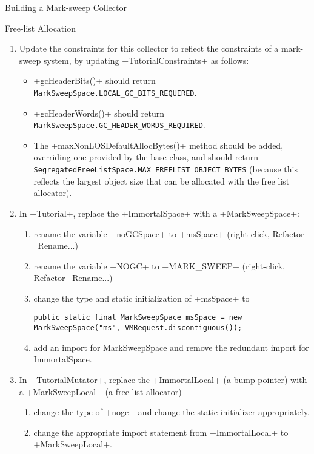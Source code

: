\begin{section}{Building a Mark-sweep Collector}
\begin{subsection}{Free-list Allocation}
\begin{enumerate}
  \item Update the constraints for this collector to reflect the constraints of a mark-sweep system, by updating \spverb+TutorialConstraints+ as follows:
    \begin{itemize}
      \item \spverb+gcHeaderBits()+ should return \texttt{Mark\-Sweep\-Space.LOCAL\_GC\_BITS\_REQUIRED}.
      \item \spverb+gcHeaderWords()+ should return \texttt{Mark\-Sweep\-Space.GC\_HEADER\_WORDS\_REQUIRED}.
      \item The \spverb+maxNonLOSDefaultAllocBytes()\spverb+ method should be added, overriding one provided by the base class, and should return \texttt{Se\-gre\-ga\-ted\-Free\-List\-Spa\-ce.MAX\_FREELIST\_OBJECT\_BYTES} (because this reflects the largest object size that can be allocated with the free list allocator).
    \end{itemize}
  \item In \spverb+Tutorial+, replace the \spverb+ImmortalSpace+ with a \spverb+MarkSweepSpace+:
    \begin{enumerate}
      \item rename the variable \spverb+noGCSpace+ to \spverb+msSpace+ (right-click, Refactor \textrightarrow\ Rename...)
      \item rename the variable \spverb+NOGC+ to \spverb+MARK_SWEEP+ (right-click, Refactor \textrightarrow\ Rename...)
      \item change the type and static initialization of \spverb+msSpace+ to
        \begin{lstlisting}
public static final MarkSweepSpace msSpace = new MarkSweepSpace("ms", VMRequest.discontiguous());
        \end{lstlisting}
      \item add an import for MarkSweepSpace and remove the redundant import for ImmortalSpace.
    \end{enumerate}
  \item In \spverb+TutorialMutator+, replace the \spverb+ImmortalLocal+ (a bump pointer) with a \spverb+MarkSweepLocal+ (a free-list allocator)
    \begin{enumerate}
      \item change the type of \spverb+nogc+ and change the static initializer appropriately.
      \item change the appropriate import statement from \spverb+ImmortalLocal+ to \spverb+MarkSweepLocal+.

\end{enumerate}
\end{enumerate}
\end{subsection}
\end{section}

